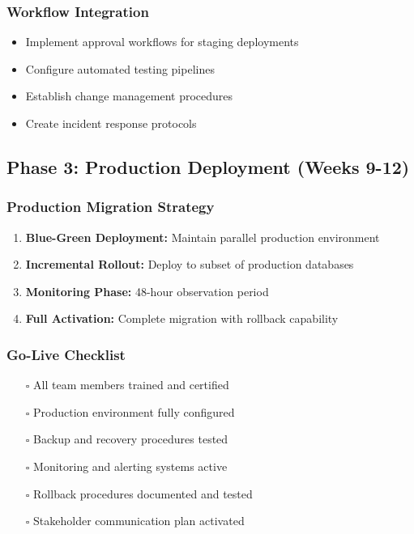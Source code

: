 \subsubsection{Workflow Integration}
\begin{itemize}
    \item Implement approval workflows for staging deployments
    \item Configure automated testing pipelines
    \item Establish change management procedures
    \item Create incident response protocols
\end{itemize}

\subsection{Phase 3: Production Deployment (Weeks 9-12)}

\subsubsection{Production Migration Strategy}
\begin{enumerate}
    \item \textbf{Blue-Green Deployment:} Maintain parallel production environment
    \item \textbf{Incremental Rollout:} Deploy to subset of production databases
    \item \textbf{Monitoring Phase:} 48-hour observation period
    \item \textbf{Full Activation:} Complete migration with rollback capability
\end{enumerate}

\subsubsection{Go-Live Checklist}
\begin{itemize}
    \item[$\square$] All team members trained and certified
    \item[$\square$] Production environment fully configured
    \item[$\square$] Backup and recovery procedures tested
    \item[$\square$] Monitoring and alerting systems active
    \item[$\square$] Rollback procedures documented and tested
    \item[$\square$] Stakeholder communication plan activated
\end{itemize}

